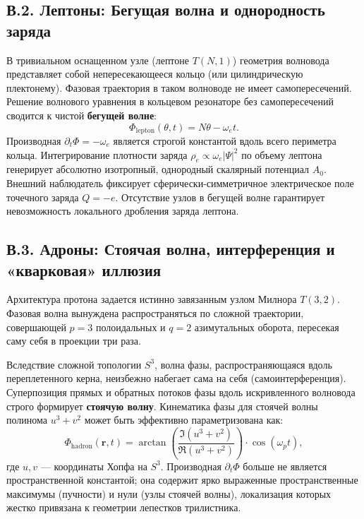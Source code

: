 \documentclass[11pt,a4paper]{article}
\begin{document}
\subsection*{В.2. Лептоны: Бегущая волна и однородность заряда}
В тривиальном оснащенном узле (лептоне $T(N,1)$) геометрия волновода представляет собой непересекающееся кольцо (или цилиндрическую плектонему). Фазовая траектория в таком волноводе не имеет самопересечений.
Решение волнового уравнения в кольцевом резонаторе без самопересечений сводится к чистой \textbf{бегущей волне}:
\begin{equation}
	\Phi_{\text{lepton}}(\theta, t) = N\theta - \omega_e t.
\end{equation}
Производная $\partial_t \Phi = -\omega_e$ является строгой константой вдоль всего периметра кольца. 
Интегрирование плотности заряда $\rho_e \propto \omega_e |\Psi|^2$ по объему лептона генерирует абсолютно изотропный, однородный скалярный потенциал $A_0$. Внешний наблюдатель фиксирует сферически-симметричное электрическое поле точечного заряда $Q = -e$. Отсутствие узлов в бегущей волне гарантирует невозможность локального дробления заряда лептона.

\subsection*{В.3. Адроны: Стоячая волна, интерференция и «кварковая» иллюзия}
Архитектура протона задается истинно завязанным узлом Милнора $T(3,2)$. Фазовая волна вынуждена распространяться по сложной траектории, совершающей $p=3$ полоидальных и $q=2$ азимутальных оборота, пересекая саму себя в проекции три раза.

Вследствие сложной топологии $S^3$, волна фазы, распространяющаяся вдоль переплетенного керна, неизбежно набегает сама на себя (самоинтерференция). Суперпозиция прямых и обратных потоков фазы вдоль искривленного волновода строго формирует \textbf{стоячую волну}. Кинематика фазы для стоячей волны полинома $u^3 + v^2$ может быть эффективно параметризована как:
\begin{equation}
	\Phi_{\text{hadron}}(\mathbf{r}, t) = \arctan\!\left(\frac{\Im(u^3 + v^2)}{\Re(u^3 + v^2)}\right) \cdot \cos(\omega_p t),
\end{equation}
где $u, v$ — координаты Хопфа на $S^3$. Производная $\partial_t \Phi$ больше не является пространственной константой; она содержит ярко выраженные пространственные максимумы (пучности) и нули (узлы стоячей волны), локализация которых жестко привязана к геометрии лепестков трилистника.
\end{document}
